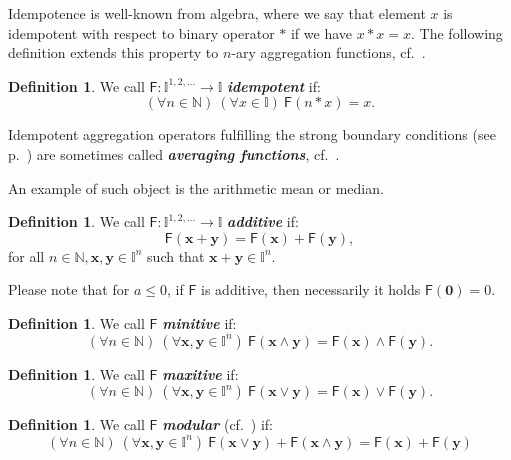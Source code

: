 \documentclass[11pt]{article}\usepackage[]{graphicx}\usepackage[]{color}
\renewcommand{\emph}[1]{\textbf{\textsl{#1}}}
\newcommand{\vect}[1]{{\mathbf{#1}}}
\newcommand{\func}[1]{{\mathsf{#1}}}
\newcommand{\Ival}{\mathbb{I}}
\newcommand{\IvalPow}[1]{\mathbb{I}^{#1}}
\newcommand{\AnyPow}{^{1,2,\dots}}
\newcommand{\IvalAnyPow}{\mathbb{I}\AnyPow}
\theoremstyle{remark}
\theoremstyle{definition}
\newtheorem{definition}[theorem]{Definition}
\begin{document}
\medskip
Idempotence is well-known from algebra,
where we say that element $x$ is idempotent with respect
to binary operator $*$ if we have $x*x=x$. The following definition
extends this property to $n$-ary aggregation functions,
cf.~\cite{GrabischETAL2009:aggregationfunctions}.

\begin{definition}
We call $\func{F}: \IvalAnyPow\to\Ival$ \emph{idempotent} if:
\[(\forall n\in\mathbb{N})\ (\forall x\in\Ival)\ \func{F}(n\ast x)=x.\]
\end{definition}

Idempotent aggregation operators fulfilling
the strong boundary conditions (see p.~\pageref{Prop:StrongBoundaryCond})
are sometimes called \emph{averaging functions}, cf.~\cite{GrabischETAL2009:aggregationfunctions}.

An example of such object is the arithmetic mean or median.

\medskip
\begin{definition}
We call $\func{F}: \IvalAnyPow\to\Ival$ \emph{additive} if:
\[
\func{F}(\vect{x}+\vect{y})=\func{F}(\vect{x})+\func{F}(\vect{y}),
\]
for all $n\in\mathbb{N}, \vect{x}, \vect{y}\in\IvalPow{n}$ such that
$\vect{x}+\vect{y}\in\IvalPow{n}$.
\end{definition}
Please note that for $a\leq 0$, if $\func{F}$ is additive,
then necessarily it holds $\func{F}(\vect{0})=0$.

\medskip
\begin{definition}
We call $\func{F}$ \emph{minitive} if:
\[
(\forall n\in\mathbb{N})\ (\forall \vect{x},\vect{y}\in\IvalPow{n})\
\func{F}(\vect{x}\wedge
\vect{y})=\func{F}(\vect{x})\wedge\func{F}(\vect{y}).
\]
\end{definition}

\medskip
\begin{definition}
We call $\func{F}$ \emph{maxitive} if:
\[
(\forall n\in\mathbb{N})\ (\forall \vect{x},\vect{y}\in\IvalPow{n})\
\func{F}(\vect{x}\vee
\vect{y})=\func{F}(\vect{x})\vee\func{F}(\vect{y}).
\]
\end{definition}

\medskip

\begin{definition}
We call $\func{F}$ \emph{modular}
(cf.~\cite{BeliakovETAL2007:aggregationpractitioners,
GrabischETAL2009:aggregationfunctions,
MesiarMesiarova2011:OMA}) if:
\[
(\forall n\in\mathbb{N})\ (\forall \vect{x},\vect{y}\in\IvalPow{n})\
\func{F}(\vect{x}\vee\vect{y})
+\func{F}(\vect{x}\wedge\vect{y})=\func{F}(\vect{x})+\func{F}
(\vect{y})
\]
%
\end{definition}
\end{document}
